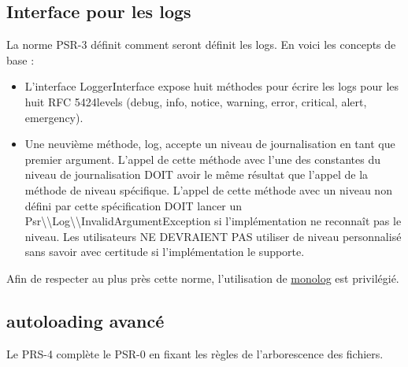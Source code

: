 \subsection{Interface pour les logs}
La norme PSR-3 définit comment seront définit les logs. En voici les concepts de base :
\begin{itemize}
  \item L'interface LoggerInterface expose huit méthodes pour écrire les logs pour les huit RFC 5424levels (debug, info, notice, warning, error, critical, alert, emergency).
  \item Une neuvième méthode, log, accepte un niveau de journalisation en tant que premier argument. L'appel de cette méthode avec l'une des constantes du niveau de journalisation DOIT avoir le même résultat que l'appel de la méthode de niveau spécifique. L'appel de cette méthode avec un niveau non défini par cette spécification DOIT lancer un Psr\textbackslash\textbackslash Log\textbackslash\textbackslash InvalidArgumentException si l'implémentation ne reconnaît pas le niveau. Les utilisateurs NE DEVRAIENT PAS utiliser de niveau personnalisé sans savoir avec certitude si l'implémentation le supporte.
\end{itemize}

Afin de respecter au plus près cette norme, l'utilisation de \href{https://github.com/Seldaek/monolog}{monolog} est privilégié.

\subsection{autoloading avancé}
Le PRS-4 complète le PSR-0 en fixant les règles de l'arborescence des fichiers.
